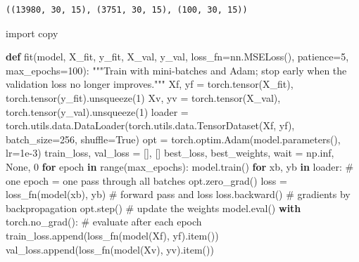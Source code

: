 \documentclass[
  letterpaper,
  DIV=11,
  numbers=noendperiod]{scrreprt}
\newenvironment{Shaded}{\begin{snugshade}}{\end{snugshade}}
\newcommand{\BuiltInTok}[1]{\textcolor[rgb]{0.00,0.23,0.31}{#1}}
\newcommand{\CommentTok}[1]{\textcolor[rgb]{0.37,0.37,0.37}{#1}}
\newcommand{\ControlFlowTok}[1]{\textcolor[rgb]{0.00,0.23,0.31}{\textbf{#1}}}
\newcommand{\DecValTok}[1]{\textcolor[rgb]{0.68,0.00,0.00}{#1}}
\newcommand{\FloatTok}[1]{\textcolor[rgb]{0.68,0.00,0.00}{#1}}
\newcommand{\ImportTok}[1]{\textcolor[rgb]{0.00,0.46,0.62}{#1}}
\newcommand{\KeywordTok}[1]{\textcolor[rgb]{0.00,0.23,0.31}{\textbf{#1}}}
\newcommand{\NormalTok}[1]{\textcolor[rgb]{0.00,0.23,0.31}{#1}}
\newcommand{\OperatorTok}[1]{\textcolor[rgb]{0.37,0.37,0.37}{#1}}
\newcommand{\VariableTok}[1]{\textcolor[rgb]{0.07,0.07,0.07}{#1}}
\begin{document}
\begin{verbatim}
((13980, 30, 15), (3751, 30, 15), (100, 30, 15))
\end{verbatim}

\begin{Shaded}
\begin{Highlighting}[]
\ImportTok{import}\NormalTok{ copy}

\KeywordTok{def}\NormalTok{ fit(model, X\_fit, y\_fit, X\_val, y\_val, loss\_fn}\OperatorTok{=}\NormalTok{nn.MSELoss(), patience}\OperatorTok{=}\DecValTok{5}\NormalTok{, max\_epochs}\OperatorTok{=}\DecValTok{100}\NormalTok{):}
    \CommentTok{"""Train with mini{-}batches and Adam; stop early when the validation loss no longer improves."""}
\NormalTok{    Xf, yf }\OperatorTok{=}\NormalTok{ torch.tensor(X\_fit), torch.tensor(y\_fit).unsqueeze(}\DecValTok{1}\NormalTok{)}
\NormalTok{    Xv, yv }\OperatorTok{=}\NormalTok{ torch.tensor(X\_val), torch.tensor(y\_val).unsqueeze(}\DecValTok{1}\NormalTok{)}
\NormalTok{    loader }\OperatorTok{=}\NormalTok{ torch.utils.data.DataLoader(torch.utils.data.TensorDataset(Xf, yf),}
\NormalTok{                                         batch\_size}\OperatorTok{=}\DecValTok{256}\NormalTok{, shuffle}\OperatorTok{=}\VariableTok{True}\NormalTok{)}
\NormalTok{    opt }\OperatorTok{=}\NormalTok{ torch.optim.Adam(model.parameters(), lr}\OperatorTok{=}\FloatTok{1e{-}3}\NormalTok{)}
\NormalTok{    train\_loss, val\_loss }\OperatorTok{=}\NormalTok{ [], []}
\NormalTok{    best\_loss, best\_weights, wait }\OperatorTok{=}\NormalTok{ np.inf, }\VariableTok{None}\NormalTok{, }\DecValTok{0}
    \ControlFlowTok{for}\NormalTok{ epoch }\KeywordTok{in} \BuiltInTok{range}\NormalTok{(max\_epochs):}
\NormalTok{        model.train()}
        \ControlFlowTok{for}\NormalTok{ xb, yb }\KeywordTok{in}\NormalTok{ loader:                            }\CommentTok{\# one epoch = one pass through all batches}
\NormalTok{            opt.zero\_grad()}
\NormalTok{            loss }\OperatorTok{=}\NormalTok{ loss\_fn(model(xb), yb)                }\CommentTok{\# forward pass and loss}
\NormalTok{            loss.backward()                              }\CommentTok{\# gradients by backpropagation}
\NormalTok{            opt.step()                                   }\CommentTok{\# update the weights}
\NormalTok{        model.}\BuiltInTok{eval}\NormalTok{()}
        \ControlFlowTok{with}\NormalTok{ torch.no\_grad():                            }\CommentTok{\# evaluate after each epoch}
\NormalTok{            train\_loss.append(loss\_fn(model(Xf), yf).item())}
\NormalTok{            val\_loss.append(loss\_fn(model(Xv), yv).item())}

\end{Highlighting}
\end{Shaded}
\end{document}
